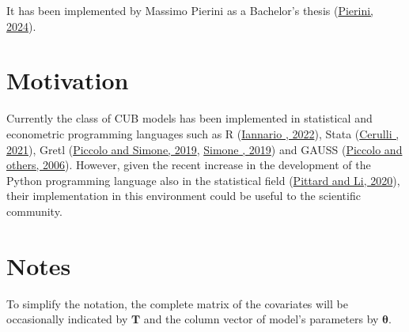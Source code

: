 \documentclass[letterpaper,10pt,english]{sphinxmanual}
\begin{document}
\sphinxAtStartPar
It has been implemented by Massimo Pierini as a Bachelor’s thesis (\hyperlink{cite.intro:id50}{Pierini, 2024}).


\section{Motivation}
\label{\detokenize{intro:motivation}}
\sphinxAtStartPar
Currently the class of CUB models has been implemented in statistical and econometric programming languages
such as R (\hyperlink{cite.intro:id31}{Iannario , 2022}), Stata (\hyperlink{cite.intro:id37}{Cerulli , 2021}),
Gretl (\hyperlink{cite.intro:id16}{Piccolo and Simone, 2019}, \hyperlink{cite.intro:id38}{Simone , 2019})
and GAUSS (\hyperlink{cite.intro:id20}{Piccolo and others, 2006}).  However, given the recent increase in the development
of the Python programming language also in the statistical field (\hyperlink{cite.intro:id36}{Pittard and Li, 2020}),
their implementation in
this environment could be useful to the scientific community.


\section{Notes}
\label{\detokenize{intro:notes}}
\sphinxAtStartPar
To simplify the notation, the complete matrix of the covariates will be occasionally
indicated by \(\pmb T\) and the column vector of model’s parameters by \(\pmb\theta\).
\end{document}
